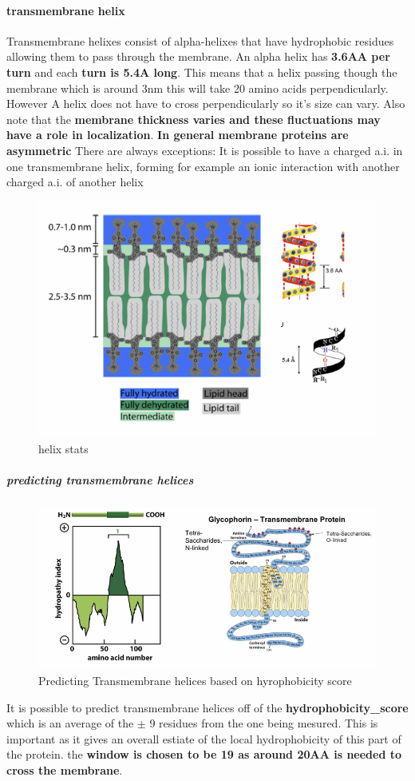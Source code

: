 \documentclass[../main.tex]{subfiles}
\begin{document}
\paragraph{transmembrane helix}
Transmembrane helixes consist of alpha-helixes that have hydrophobic residues allowing them to pass through the membrane. An alpha helix has \textbf{3.6AA per turn} and each \textbf{turn is 5.4A long}. This means that a helix passing though the membrane which is around 3nm this will take 20 amino acids perpendicularly. However A helix does not have to cross perpendicularly so it's size can vary. Also note that  the \textbf{membrane thickness varies and these fluctuations may have a role in localization}.\textbf{ In general  membrane proteins are asymmetric}
 There are always exceptions:
 It is possible to have a charged a.i. in one transmembrane 
helix, forming for example an ionic interaction with another 
charged a.i. of another helix
\begin{figure}[H]
    \centering
    \includegraphics[width=0.5\linewidth]{helix_overview.png}
    \caption{helix stats}
    \label{fig:enter-label}
\end{figure}

\subparagraph{predicting transmembrane helices}
\begin{figure}[H]
    \centering
    \includegraphics[width=0.5\linewidth]{transmembrane_helix.png}
    \caption{Predicting Transmembrane helices based on hyrophobicity score}
    \label{fig:enter-label}
\end{figure}
It is possible to predict transmembrane helices off of the \textbf{\gls{hydrophobicity_score}} which is an average of the $\pm$ 9 residues from the one being mesured. This is important as it gives an overall estiate of the local hydrophobicity of this part of the protein. the \textbf{window is chosen to be 19 as around 20AA is needed to cross the membrane}.
\end{document}
